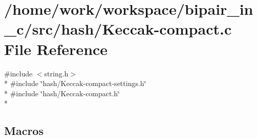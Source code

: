 \hypertarget{Keccak-compact_8c}{\section{/home/work/workspace/bipair\-\_\-in\-\_\-c/src/hash/\-Keccak-\/compact.c File Reference}
\label{Keccak-compact_8c}
}
{\ttfamily \#include $<$string.\-h$>$}\\*
{\ttfamily \#include \char`\"{}hash/\-Keccak-\/compact-\/settings.\-h\char`\"{}}\\*
{\ttfamily \#include \char`\"{}hash/\-Keccak-\/compact.\-h\char`\"{}}\\*
\subsection*{Macros}
